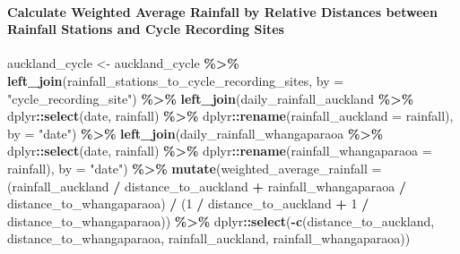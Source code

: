 \documentclass[
]{article}
\newenvironment{Shaded}{\begin{snugshade}}{\end{snugshade}}
\newcommand{\AttributeTok}[1]{\textcolor[rgb]{0.13,0.29,0.53}{#1}}
\newcommand{\DecValTok}[1]{\textcolor[rgb]{0.00,0.00,0.81}{#1}}
\newcommand{\FunctionTok}[1]{\textcolor[rgb]{0.13,0.29,0.53}{\textbf{#1}}}
\newcommand{\NormalTok}[1]{#1}
\newcommand{\OtherTok}[1]{\textcolor[rgb]{0.56,0.35,0.01}{#1}}
\newcommand{\SpecialCharTok}[1]{\textcolor[rgb]{0.81,0.36,0.00}{\textbf{#1}}}
\newcommand{\StringTok}[1]{\textcolor[rgb]{0.31,0.60,0.02}{#1}}
\begin{document}
\hypertarget{calculate-weighted-average-rainfall-by-relative-distances-between-rainfall-stations-and-cycle-recording-sites}{%
\paragraph{Calculate Weighted Average Rainfall by Relative Distances
between Rainfall Stations and Cycle Recording
Sites}\label{calculate-weighted-average-rainfall-by-relative-distances-between-rainfall-stations-and-cycle-recording-sites}}

\begin{Shaded}
\begin{Highlighting}[]
\NormalTok{auckland\_cycle }\OtherTok{\textless{}{-}}\NormalTok{ auckland\_cycle }\SpecialCharTok{\%\textgreater{}\%}
  \FunctionTok{left\_join}\NormalTok{(rainfall\_stations\_to\_cycle\_recording\_sites, }\AttributeTok{by =} \StringTok{"cycle\_recording\_site"}\NormalTok{) }\SpecialCharTok{\%\textgreater{}\%}
  \FunctionTok{left\_join}\NormalTok{(daily\_rainfall\_auckland }\SpecialCharTok{\%\textgreater{}\%}\NormalTok{ dplyr}\SpecialCharTok{::}\FunctionTok{select}\NormalTok{(date, rainfall) }\SpecialCharTok{\%\textgreater{}\%}\NormalTok{ dplyr}\SpecialCharTok{::}\FunctionTok{rename}\NormalTok{(}\AttributeTok{rainfall\_auckland =}\NormalTok{ rainfall), }\AttributeTok{by =} \StringTok{"date"}\NormalTok{) }\SpecialCharTok{\%\textgreater{}\%}
  \FunctionTok{left\_join}\NormalTok{(daily\_rainfall\_whangaparaoa }\SpecialCharTok{\%\textgreater{}\%}\NormalTok{ dplyr}\SpecialCharTok{::}\FunctionTok{select}\NormalTok{(date, rainfall) }\SpecialCharTok{\%\textgreater{}\%}\NormalTok{ dplyr}\SpecialCharTok{::}\FunctionTok{rename}\NormalTok{(}\AttributeTok{rainfall\_whangaparaoa =}\NormalTok{ rainfall), }\AttributeTok{by =} \StringTok{"date"}\NormalTok{) }\SpecialCharTok{\%\textgreater{}\%}
  \FunctionTok{mutate}\NormalTok{(}\AttributeTok{weighted\_average\_rainfall =}\NormalTok{ (rainfall\_auckland }\SpecialCharTok{/}\NormalTok{ distance\_to\_auckland }\SpecialCharTok{+}\NormalTok{ rainfall\_whangaparaoa }\SpecialCharTok{/}\NormalTok{ distance\_to\_whangaparaoa) }\SpecialCharTok{/}
\NormalTok{                        (}\DecValTok{1} \SpecialCharTok{/}\NormalTok{ distance\_to\_auckland }\SpecialCharTok{+} \DecValTok{1} \SpecialCharTok{/}\NormalTok{ distance\_to\_whangaparaoa)) }\SpecialCharTok{\%\textgreater{}\%}
\NormalTok{  dplyr}\SpecialCharTok{::}\FunctionTok{select}\NormalTok{(}\SpecialCharTok{{-}}\FunctionTok{c}\NormalTok{(distance\_to\_auckland, distance\_to\_whangaparaoa, rainfall\_auckland, rainfall\_whangaparaoa))}
\end{Highlighting}
\end{Shaded}
\end{document}
